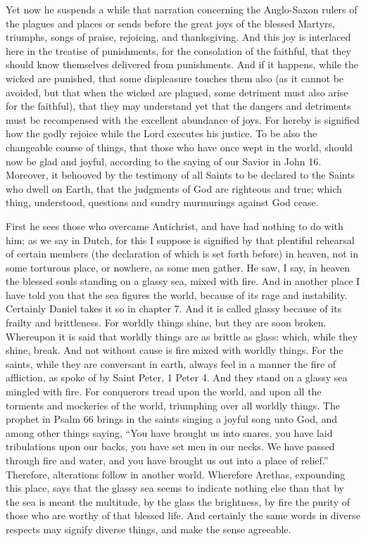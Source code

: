 Yet now he suspends a while that narration concerning the Anglo-Saxon rulers of the plagues and places or sends before the great joys of the blessed Martyrs, triumphs, songs of praise, rejoicing, and thanksgiving. And this joy is interlaced here in the treatise of punishments, for the consolation of the faithful, that they should know themselves delivered from punishments. And if it happens, while the wicked are punished, that some displeasure touches them also (as it cannot be avoided, but that when the wicked are plagued, some detriment must also arise for the faithful), that they may understand yet that the dangers and detriments must be recompensed with the excellent abundance of joys. For hereby is signified how the godly rejoice while the Lord executes his justice. To be also the changeable course of things, that those who have once wept in the world, should now be glad and joyful, according to the saying of our Savior in John 16. Moreover, it behooved by the testimony of all Saints to be declared to the Saints who dwell on Earth, that the judgments of God are righteous and true; which thing, understood, questions and sundry murmurings against God cease.

First he sees those who overcame Antichrist, and have had nothing to do with him; as we say in Dutch, for this I suppose is signified by that plentiful rehearsal of certain members (the declaration of which is set forth before) in heaven, not in some torturous place, or nowhere, as some men gather. He saw, I say, in heaven the blessed souls standing on a glassy sea, mixed with fire. And in another place I have told you that the sea figures the world, because of its rage and instability. Certainly Daniel takes it so in chapter 7. And it is called glassy because of its frailty and brittleness. For worldly things shine, but they are soon broken. Whereupon it is said that worldly things are as brittle as glass: which, while they shine, break. And not without cause is fire mixed with worldly things. For the saints, while they are conversant in earth, always feel in a manner the fire of affliction, as spoke of by Saint Peter, 1 Peter 4. And they stand on a glassy sea mingled with fire. For conquerors tread upon the world, and upon all the torments and mockeries of the world, triumphing over all worldly things. The prophet in Psalm 66 brings in the saints singing a joyful song unto God, and among other things saying, “You have brought us into snares, you have laid tribulations upon our backs, you have set men in our necks. We have passed through fire and water, and you have brought us out into a place of relief.” Therefore, alterations follow in another world. Wherefore Arethas, expounding this place, says that the glassy sea seems to indicate nothing else than that by the sea is meant the multitude, by the glass the brightness, by fire the purity of those who are worthy of that blessed life. And certainly the same words in diverse respects may signify diverse things, and make the sense agreeable.

